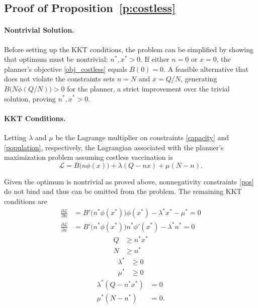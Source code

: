 \documentclass[12pt]{article}
\newcommand{\efficacy}{\phi}
\newcommand{\benefit}{B}
\newcommand{\Lagrangian}{\mathscr{L}}
\begin{document}

\subsection*{Proof of Proposition~\ref{p:costless}}

\paragraph{Nontrivial Solution.}

Before setting up the KKT conditions, the problem can be simplified by
showing that optimum must be nontrivial: $n^*, x^* > 0$.  If either $n
= 0$ or $x = 0$, the planner's objective \eqref{obj_costless} equals
$\benefit(0) = 0$. A feasible alternative that does not violate the
constraints sets $n = N$ and $x = Q/N$, generating $\benefit \bigl(
N\efficacy(Q/N) \bigr) > 0$ for the planner, a strict improvement over
the trivial solution, proving $n^*, x^* > 0$.

\paragraph{KKT Conditions.}

Letting $\lambda$ and $\mu$ be the Lagrange multiplier on constraints
\eqref{capacity} and \eqref{population}, respectively, the Lagrangian
associated with the planner's maximization problem assuming costless
vaccination is
\begin{equation}
\label{a:Lagrangian_costless}
\Lagrangian = \benefit \bigl( n \efficacy(x) \bigr) + \lambda(Q - nx)
+ \mu(N - n).
\end{equation}

Given the optimum is nontrivial as proved above, nonnegativity
constraints \eqref{pos} do not bind and thus can be omitted from the
problem. The remaining KKT conditions are
\begin{align}
\frac{\partial \Lagrangian}{\partial n} & = \benefit'\!\bigl( n^* \efficacy(x^*) \bigr) \efficacy(x^*) - \lambda^* x^* - \mu^* = 0 \label{a:partial_L_partial_n} \\
\frac{\partial \Lagrangian}{\partial x} & = \benefit'\!\bigl( n^* \efficacy(x^*) \bigr) n^* \efficacy'(x^*) - \lambda^* n^* = 0 \label{a:partial_L_partial_x} 
\end{align}
\begin{align}
Q & \geq n^* x^*  \label{a:KKT_capacity} \\
N & \geq n^*  \label{a:KKT_population}
\end{align}
\begin{align}
\lambda^* & \geq 0 \label{a:lambda} \\
\mu^* & \geq 0 \label{a:mu}
\end{align}
\begin{align}
\lambda^* (Q - n^* x^*) & = 0 \label{a:cs_capacity} \\
\mu^* (N - n^*) & = 0. \label{a:cs_population}
\end{align}
\end{document}
